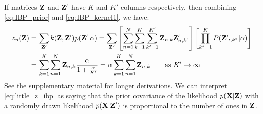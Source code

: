 If matrices $\mathbf{Z}$ and $\mathbf{Z}'$ have $K$ and $K'$ columns respectively, then combining \eqref{eq:IBP_prior} and \eqref{eq:IBP_kernel1}, we have:
%
\begin{align}
z_n( \mathbf{Z} ) & = \sum_{\mathbf{Z}'} k(\mathbf{Z}, \mathbf{Z}') p(\mathbf{Z}' | \alpha)
  = \sum_{\mathbf{Z}'} \left[ \sum_{n=1}^N \sum_{k=1}^{K} \sum_{k'=1}^{K'} \mathbf{Z}_{n,k} \mathbf{Z}'_{n,k'} \right] \left[ \prod_{{k}^*=1}^K P({\mathbf{Z}'}_{:,k^*} | \alpha ) \right] \\
& = \sum_{k=1}^{K} \sum_{n=1}^N \mathbf{Z}_{n,k} \frac{\alpha}{1 + \frac{\alpha}{K'}} 
 = \alpha  \sum_{k=1}^{K} \sum_{n=1}^N \mathbf{Z}_{n,k} \qquad \textrm{as $K' \rightarrow \infty$}
\label{eq:little_z_ibp}
\end{align}
%
See the supplementary material for longer derivations.
%
We can interpret \eqref{eq:little_z_ibp} as saying that the prior covariance of the likelihood $p(\mathbf{X}|\mathbf{Z})$ with a randomly drawn likelihood $p(\mathbf{X}|\mathbf{Z}')$ is proportional to the number of ones in $\mathbf{Z}$.  %


